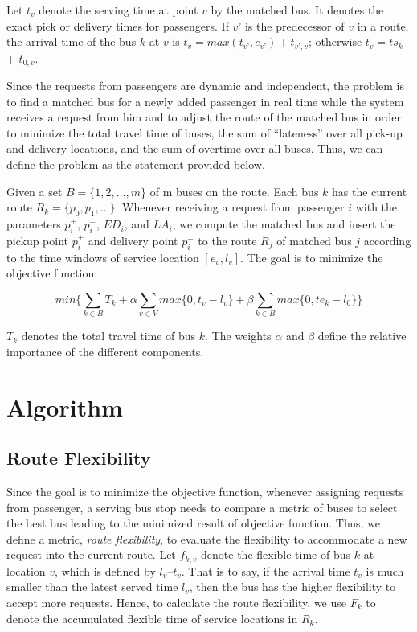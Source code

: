 \documentclass[runningheads]{llncs}
\begin{document}
Let $t_v$ denote the serving time at point $v$ by the matched bus. It denotes the exact pick or delivery times for passengers. If $v’$ is the predecessor of $v$ in a route, the arrival time of the bus $k$ at $v$ is $t_v = max(t_{v’}, e_{v’}) + t_{v’, v}$; otherwise $t_v = ts_k$ + $t_{0, v}$.


Since the requests from passengers are dynamic and independent, the problem is to find a matched bus for a newly added passenger in real time while the system receives a request from him and to adjust the route of the matched bus in order to minimize the total travel time of buses, the sum of ``lateness'' over all pick-up and delivery locations, and the sum of overtime over all buses. Thus, we can define the problem as the statement provided below.

Given a set $B = \{1, 2, \dots, m\}$ of m buses on the route. Each bus $k$ has the current route $R_k = \{p_0, p_1, \dots\}$. Whenever receiving a request from passenger $i$ with the parameters $p_i^+$, $p_i^-$, $ED_i$, and $LA_i$, we compute the matched bus and insert the pickup point $p_i^+$ and delivery point $p_i^-$ to the route $R_j$ of matched bus $j$ according to the time windows of service location $[e_v, l_v]$. The goal is to minimize the objective function:

\begin{equation}
min\{\sum_{k\in B}{T_k} + \alpha\sum_{v\in V}{max\{0, t_v - l_v\}} + \beta\sum_{k\in B}{max\{0, te_k - l_0\}} \}
\end{equation}

$T_k$ denotes the total travel time of bus $k$. The weights $\alpha$ and $\beta$ define the relative importance of the different components.

\section{Algorithm}
\subsection{Route Flexibility}
Since the goal is to minimize the objective function, whenever assigning requests from passenger, a serving bus stop needs to compare a metric of buses to select the best bus leading to the minimized result of objective function. Thus, we define a metric, \emph{route flexibility}, to evaluate the flexibility to accommodate a new request into the current route. Let $f_{k,v}$ denote the flexible time of bus $k$ at location $v$, which is defined by $l_v – t_v$. That is to say, if the arrival time $t_v$ is much smaller than the latest served time $l_v$, then the bus has the higher flexibility to accept more requests. Hence, to calculate the route flexibility, we use $F_k$ to denote the accumulated flexible time of service locations in $R_k$.
\end{document}
